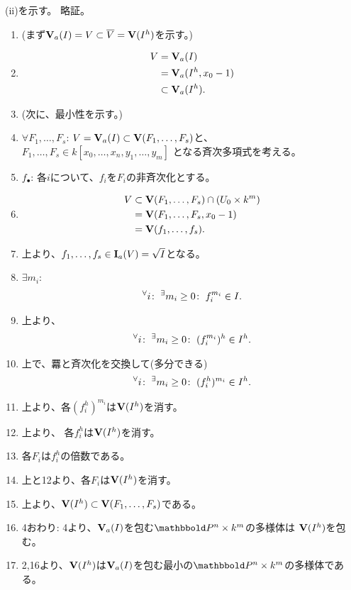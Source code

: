 \begin{myproof}
  (ii)を示す。
  略証。
  \begin{enumerate}
    \item (まず$\textbf V_a(I)=V\subset \overline V = \textbf V(I^h)$を示す。)
    \item
    \begin{align}
      V
      &=
      \textbf V_a(I)\\
      &=
      \textbf V_a(I^h, x_0-1)\\
      &\subset
      \textbf V_a(I^h).
    \end{align}
    \item
    (次に、最小性を示す。)
    \item $\forall F_1,\dots,F_s$:
    $V=\textbf V_a(I)\subset \textbf V(F_1,\dots,F_s)$と、
    $F_1,\dots,F_s \in k[x_0,\dots,x_n,y_1,\dots,y_m]$
    となる\xs 斉次多項式を考える。
    \item $f_\bullet$:
    各$i$について、$f_i$を$F_i$の非斉次化とする。
    \item
    \begin{align}
      V
      &\subset
      \textbf V(F_1,\dots,F_s) \cap (U_0\times k^m)\\
      &=
      \textbf V(F_1,\dots,F_s,x_0-1)\\
      &=
      \textbf V(f_1,\dots,f_s).
    \end{align}
    \item
    上より、$f_1,\dots,f_s \in \textbf I_a(V) = \sqrt{I}$となる。
    \item $\exists m_i$:
    \begin{align}
      {}^{\forall}{i}\mathrm{\colon\;}{}^{\exists}{m_i \ge 0}\mathrm{\colon\;} f_i^{m_i}\in I.
    \end{align}
    \item
    上より、
    \begin{align}
      {}^{\forall}{i}\mathrm{\colon\;} {}^{\exists}{m_i \ge 0}\mathrm{\colon\;} (f_i^{m_i})^h \in I^h.
    \end{align}
    \item
    上で、羃と斉次化を交換して(多分できる)
    \begin{align}
      {}^{\forall}{i}\mathrm{\colon\;} {}^{\exists}{m_i \ge 0}\mathrm{\colon\;} (f_i^h)^{m_i} \in I^h.
    \end{align}
    \item
    上より、各$(f_i^h)^{m_i}$は$\textbf V(I^h)$を消す。
    \item
    上より、
    各$f_i^h$は$\textbf V(I^h)$を消す。
    \item
    各$F_i$は$f_i^h$の倍数である。
    \item
    上と12より、各$F_i$は$\textbf V(I^h)$を消す。
    \item
    上より、$\textbf V(I^h) \subset \textbf V(F_1,\dots,F_s)$である。
    \item 4おわり:
    4より、$\textbf V_a(I)$を包む$\P^n\times k^m$の多様体は
    $\textbf V(I^h)$を包む。
    \item
    2,16より、$\textbf V(I^h)$は$\textbf V_a(I)$を包む最小の$\P^n\times k^m$の多様体である。
  \end{enumerate}
\end{myproof}

